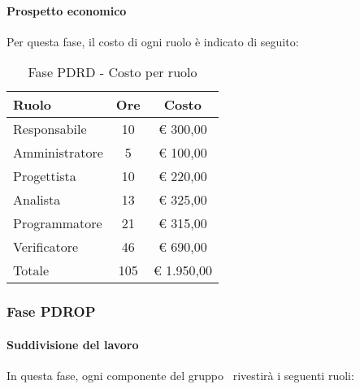 \documentclass[../PianoProgetto.tex]{subfiles}
\begin{document}
	\paragraph{Prospetto economico}
					Per questa fase, il costo di ogni ruolo è indicato di seguito:
					\begin{table}[h]
		\centering
	
		\begin{tabular}{l * {2}{c}}
			\toprule
			Ruolo & Ore & Costo \\
			\midrule
			Responsabile &	10 & \euro{} 300,00 \\
			\midrule
			Amministratore & 5 & \euro{} 100,00 \\
			\midrule
			Progettista & 10 & \euro{} 220,00 \\
			\midrule
			Analista & 13 & \euro{} 325,00 \\
			\midrule
			Programmatore & 21 & \euro{} 315,00 \\
			\midrule
			Verificatore & 46 & \euro{} 690,00 \\
			\midrule		
			Totale & 105 & \euro{} 1.950,00 \\
			\bottomrule
			
		\end{tabular}
		
		\caption{Fase PDRD - Costo per ruolo}
		\label{tab:fasePDRD_costo}
		
	\end{table}
	
	\subsubsection{Fase PDROP}
				\paragraph{Suddivisione del lavoro}
					In questa fase, ogni componente del gruppo \leaf\ rivestirà i seguenti ruoli:
	
\end{document}
